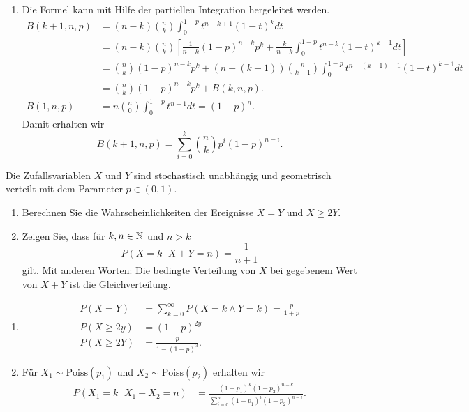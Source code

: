 \solution
\begin{enumerate}
    \item Die Formel kann mit Hilfe der partiellen Integration hergeleitet werden.
        \begin{align*}
            B(k+1, n, p) &= (n-k) \binom{n}{k} \int_{0}^{1-p} t^{n-k+1} (1-t)^{k} dt \\
            &= (n-k)\binom{n}{k} \left[  \frac{1}{n-k}(1-p)^{n-k} p^{k} + 
            \frac{k}{n-k} \int_{0}^{1-p} t^{n-k} (1-t)^{k-1} dt \right] \\
            &= \binom{n}{k} (1-p)^{n-k} p^{k} + 
            (n-(k-1)) \binom{n}{k-1} \int_{0}^{1-p} t^{n-(k-1)-1} (1-t)^{k-1} dt \\
            &= \binom{n}{k} (1-p)^{n-k} p^{k} + B(k, n, p). \\
            B(1,n,p) &= n \binom{n}{0} \int_{0}^{1-p} t^{n-1} dt = (1-p)^n.
        \end{align*}
        Damit erhalten wir
        \begin{equation*}
            B(k+1, n,p) = \sum_{i=0}^{k} \binom{n}{k} p^{i}(1-p)^{n-i}.
        \end{equation*}
\end{enumerate}

Die Zufallsvariablen $X$ und $Y$ sind stochastisch unabhängig und geometrisch verteilt mit dem Parameter $p\in(0,1)$.
\begin{enumerate}
    \item Berechnen Sie die Wahrscheinlichkeiten der Ereignisse $X=Y$ und
        $X\geq 2Y$.

    \item Zeigen Sie, dass für $k,n\in\mathbb N$ und $n>k$
        \begin{equation*}
            P \left( X = k \,|\, X+Y = n \right) = \frac{1}{n+1}
        \end{equation*}
        gilt. Mit anderen Worten: Die bedingte Verteilung von $X$ bei gegebenem Wert von 
        $X+Y$ ist die Gleichverteilung.
\end{enumerate}

\solution
\begin{enumerate}
    \item \begin{align*}
            P\left( X = Y \right) &= \sum_{k=0}^{\infty} P\left( X=k \wedge Y=k \right) = \frac{p}{1+p} \\
            P\left( X \geq 2y \right) &= \left( 1-p \right)^{2y} \\
            P\left( X \geq 2Y \right) &= \frac{p}{1- (1-p)^{3}}.
        \end{align*}

    \item Für $X_1 \sim \text{Poiss}(p_1)$ und $X_2\sim\text{Poiss}(p_2)$ erhalten wir
        \begin{align*}
            P\left( X_1 = k \,|\, X_1+X_2 = n \right) &= 
            \frac{(1-p_1)^{k} (1-p_2)^{n-k}  }{ \sum_{i=0}^{n} (1-p_1)^i (1-p_2)^{n-i} }. 
        \end{align*}
\end{enumerate}



